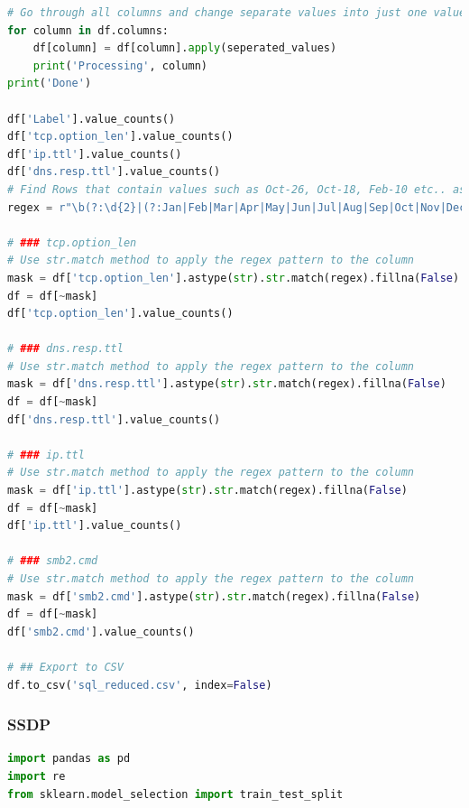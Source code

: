 \begin{appendices}
\begin{lstlisting}[language=Python]
# Go through all columns and change separate values into just one value
for column in df.columns:
    df[column] = df[column].apply(seperated_values)
    print('Processing', column)
print('Done')

df['Label'].value_counts()
df['tcp.option_len'].value_counts()
df['ip.ttl'].value_counts()
df['dns.resp.ttl'].value_counts()
# Find Rows that contain values such as Oct-26, Oct-18, Feb-10 etc.. as these appear to be invalid and we will drop these rows.
regex = r"\b(?:\d{2}|(?:Jan|Feb|Mar|Apr|May|Jun|Jul|Aug|Sep|Oct|Nov|Dec))-(?:\d{2}|(?:Jan|Feb|Mar|Apr|May|Jun|Jul|Aug|Sep|Oct|Nov|Dec))\b"

# ### tcp.option_len
# Use str.match method to apply the regex pattern to the column
mask = df['tcp.option_len'].astype(str).str.match(regex).fillna(False)
df = df[~mask]
df['tcp.option_len'].value_counts()

# ### dns.resp.ttl
# Use str.match method to apply the regex pattern to the column
mask = df['dns.resp.ttl'].astype(str).str.match(regex).fillna(False)
df = df[~mask]
df['dns.resp.ttl'].value_counts()

# ### ip.ttl
# Use str.match method to apply the regex pattern to the column
mask = df['ip.ttl'].astype(str).str.match(regex).fillna(False)
df = df[~mask]
df['ip.ttl'].value_counts()

# ### smb2.cmd
# Use str.match method to apply the regex pattern to the column
mask = df['smb2.cmd'].astype(str).str.match(regex).fillna(False)
df = df[~mask]
df['smb2.cmd'].value_counts()

# ## Export to CSV
df.to_csv('sql_reduced.csv', index=False)	
\end{lstlisting}


\subsubsection*{SSDP}
\begin{lstlisting}[language=Python]
import pandas as pd
import re
from sklearn.model_selection import train_test_split


\end{lstlisting}
\end{appendices}
